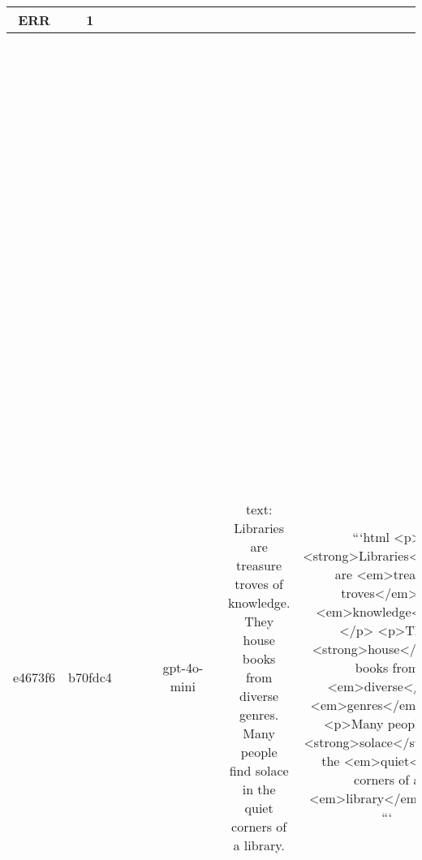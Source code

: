 \begin{table}[h!]
\begin{tabular}{|c|c|c|c|c|c|c|c|c|c|}
ERR & 1\\
\hline
e4673f6 & b70fdc4 &  &  & gpt-4o-mini & text: Libraries are treasure troves of knowledge. They house books from diverse genres. Many people find solace in the quiet corners of a library. & ```html
<p><strong>Libraries</strong> are <em>treasure troves</em> of <em>knowledge</em>.</p>
<p>They <strong>house</strong> books from <em>diverse</em> <em>genres</em>.</p>
<p>Many people find <strong>solace</strong> in the <em>quiet</em> corners of a <em>library</em>.</p>
``` & ok & The chatbot's output includes three `<p>` tags, which adheres to the requirement that the answer should have at least three `<p>` tags. Each `<p>` tag contains one `<strong>` tag, which satisfies the condition of having one `<strong>` tag per `<p>` tag. Additionally, there are multiple `<em>` tags within each `<p>` tag, complying with the requirement to add multiple `<em>` tags to emphasize key words and phrases.

According to the description, without needing the input, the output complies with the specified requirements: at least three `<p>` tags, one `<strong>` tag inside each, and multiple `<em>` tags inside each. Therefore, there is no violation of the described guidelines.

OK & 1\\
\hline
e4673f6 & b70fdc4 &  &  & gemma2:9b & text: Libraries are treasure troves of knowledge. They house books from diverse genres. Many people find solace in the quiet corners of a library. & <p><strong>Libraries</strong> are <em>treasure troves</em> of <em>knowledge</em>.</p>
<p>They <strong>house</strong> <em>books</em> from <em>diverse genres</em>.</p> 
<p><strong>Many people</strong> find <em>solace</em> in the <em>quiet corners</em> of a library.</p> 


 & ok & The chatbot output includes three separate `<p>` tags, which aligns with the requirement of having at least three `<p>` tags in the description. Within each `<p>` tag, there is at least one `<strong>` tag to emphasize key terms, which also adheres to the description. Additionally, multiple `<em>` tags are used within each paragraph to further emphasize key words and phrases, meeting another requirement outlined in the description. There are no explicit violations of the guidelines provided for the formatting task. 


\end{tabular}
\end{table}
